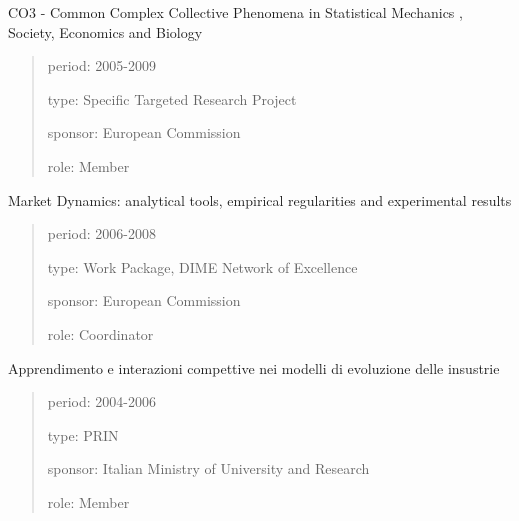 \documentclass[a4paper]{article}
\newenvironment{DUfieldlist}%
    {\quote\description}
    {\enddescription\endquote}
\begin{document}
CO3 - Common Complex Collective Phenomena in Statistical Mechanics ,
Society, Economics and Biology
%
\begin{quote}
%
\begin{DUfieldlist}
\item[{period:}]
2005-2009

\item[{type:}]
Specific Targeted Research Project

\item[{sponsor:}]
European Commission

\item[{role:}]
Member

\end{DUfieldlist}

\end{quote}

Market Dynamics: analytical tools, empirical regularities and
experimental results
%
\begin{quote}
%
\begin{DUfieldlist}
\item[{period:}]
2006-2008

\item[{type:}]
Work Package, DIME Network of Excellence

\item[{sponsor:}]
European Commission

\item[{role:}]
Coordinator

\end{DUfieldlist}

\end{quote}

Apprendimento e interazioni compettive nei modelli di evoluzione delle
insustrie
%
\begin{quote}
%
\begin{DUfieldlist}
\item[{period:}]
2004-2006

\item[{type:}]
PRIN

\item[{sponsor:}]
Italian Ministry of University and Research

\item[{role:}]
Member

\end{DUfieldlist}

\end{quote}
\end{document}
